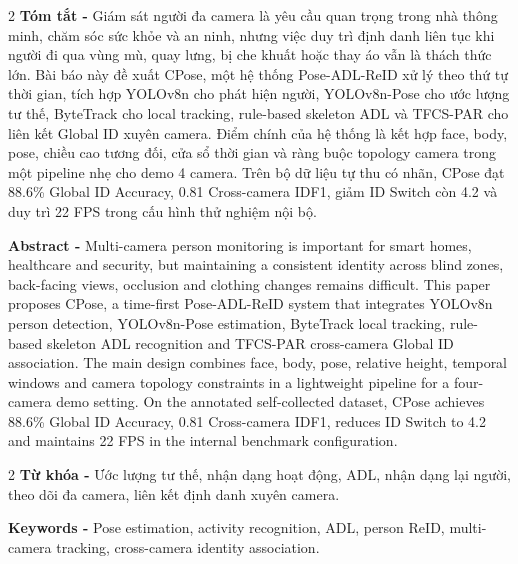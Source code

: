 \documentclass[a4paper, twoside, 10pt]{article}
\begin{document}
\begin{multicols}{2}
\textbf{Tóm tắt -} Giám sát người đa camera là yêu cầu quan trọng trong nhà thông minh, chăm sóc sức khỏe và an ninh, nhưng việc duy trì định danh liên tục khi người đi qua vùng mù, quay lưng, bị che khuất hoặc thay áo vẫn là thách thức lớn. Bài báo này đề xuất CPose, một hệ thống Pose-ADL-ReID xử lý theo thứ tự thời gian, tích hợp YOLOv8n cho phát hiện người, YOLOv8n-Pose cho ước lượng tư thế, ByteTrack cho local tracking, rule-based skeleton ADL và TFCS-PAR cho liên kết Global ID xuyên camera. Điểm chính của hệ thống là kết hợp face, body, pose, chiều cao tương đối, cửa sổ thời gian và ràng buộc topology camera trong một pipeline nhẹ cho demo 4 camera. Trên bộ dữ liệu tự thu có nhãn, CPose đạt 88.6\% Global ID Accuracy, 0.81 Cross-camera IDF1, giảm ID Switch còn 4.2 và duy trì 22 FPS trong cấu hình thử nghiệm nội bộ.

\columnbreak

\textbf{Abstract -} Multi-camera person monitoring is important for smart homes, healthcare and security, but maintaining a consistent identity across blind zones, back-facing views, occlusion and clothing changes remains difficult. This paper proposes CPose, a time-first Pose-ADL-ReID system that integrates YOLOv8n person detection, YOLOv8n-Pose estimation, ByteTrack local tracking, rule-based skeleton ADL recognition and TFCS-PAR cross-camera Global ID association. The main design combines face, body, pose, relative height, temporal windows and camera topology constraints in a lightweight pipeline for a four-camera demo setting. On the annotated self-collected dataset, CPose achieves 88.6\% Global ID Accuracy, 0.81 Cross-camera IDF1, reduces ID Switch to 4.2 and maintains 22 FPS in the internal benchmark configuration.
\end{multicols}

\begin{multicols}{2}
\textbf{Từ khóa -} Ước lượng tư thế, nhận dạng hoạt động, ADL, nhận dạng lại người, theo dõi đa camera, liên kết định danh xuyên camera.

\columnbreak

\textbf{Keywords -} Pose estimation, activity recognition, ADL, person ReID, multi-camera tracking, cross-camera identity association.
\end{multicols}
\end{document}
